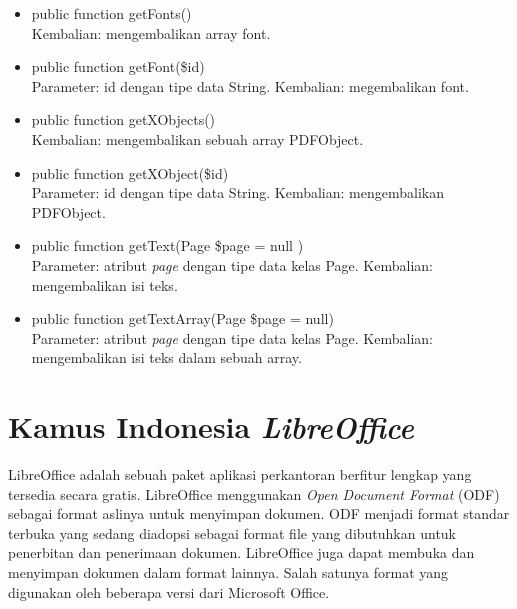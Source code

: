 \begin{itemize}
	\item public function getFonts() \\
	Kembalian: mengembalikan array font.	
	
	\item public function getFont(\$id) \\
	Parameter: id dengan tipe data String. \newline
	Kembalian: megembalikan font.
	
	\item public function getXObjects() \\
	Kembalian: mengembalikan sebuah array PDFObject.
	
	\item public function getXObject(\$id) \\
	Parameter: id dengan tipe data String. \newline
	Kembalian: mengembalikan PDFObject.
	
	\item public function getText(Page \$page = null )\\
	Parameter: atribut \textit{page} dengan tipe data kelas Page. \newline
	Kembalian: mengembalikan isi teks.
		
	\item public function getTextArray(Page \$page = null) \\
	Parameter: atribut \textit{page} dengan tipe data kelas Page. \newline
	Kembalian: mengembalikan isi teks dalam sebuah array.
	
\end{itemize}

\section{Kamus Indonesia \textit{LibreOffice}}
\label{sec:kamusindo}

LibreOffice adalah sebuah paket aplikasi perkantoran berfitur lengkap yang tersedia secara gratis. LibreOffice menggunakan \textit{Open Document Format} (ODF) sebagai format aslinya untuk menyimpan dokumen. ODF menjadi format standar terbuka yang sedang diadopsi sebagai format file yang dibutuhkan untuk penerbitan dan penerimaan dokumen. LibreOffice juga dapat membuka dan menyimpan dokumen dalam format lainnya. Salah satunya format yang digunakan oleh beberapa versi dari Microsoft Office.

